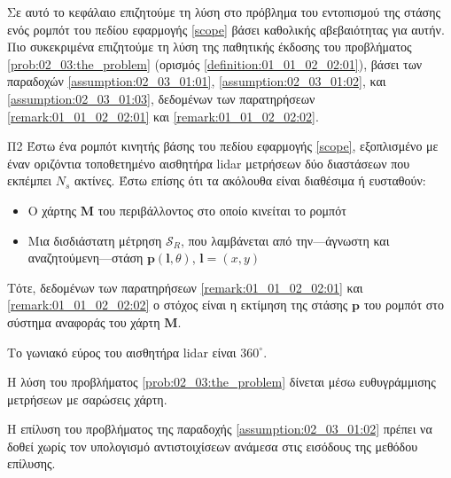 Σε αυτό το κεφάλαιο επιζητούμε τη λύση στο πρόβλημα του εντοπισμού της στάσης
ενός ρομπότ του πεδίου εφαρμογής \ref{scope} βάσει καθολικής αβεβαιότητας για
αυτήν. Πιο συκεκριμένα επιζητούμε τη λύση της παθητικής έκδοσης του προβλήματος
\ref{prob:02_03:the_problem} (ορισμός \ref{definition:01_01_02_02:01}), βάσει
των παραδοχών \ref{assumption:02_03_01:01}, \ref{assumption:02_03_01:02}, και
\ref{assumption:02_03_01:03}, δεδομένων των παρατηρήσεων
\ref{remark:01_01_02_02:01} και \ref{remark:01_01_02_02:02}.

\begin{bw_box}
\begin{customproblem}{Π2}
  \label{prob:02_03:the_problem}
  Έστω ένα ρομπότ κινητής βάσης του πεδίου εφαρμογής \ref{scope}, εξοπλισμένο με
  έναν οριζόντια τοποθετημένο αισθητήρα lidar μετρήσεων δύο διαστάσεων που
  εκπέμπει $N_s$ ακτίνες. Έστω επίσης ότι τα ακόλουθα είναι διαθέσιμα ή
  ευσταθούν:
  \begin{itemize}
    \item Ο χάρτης $\bm{M}$ του περιβάλλοντος στο οποίο κινείται το ρομπότ
    \item Μια δισδιάστατη μέτρηση $\mathcal{S}_R$, που λαμβάνεται από
          την---άγνωστη και αναζητούμενη---στάση $\bm{p}(\bm{l},\theta)$,
          $\bm{l} = (x,y)$
  \end{itemize}
\end{customproblem}
Τότε, δεδομένων των παρατηρήσεων \ref{remark:01_01_02_02:01} και
\ref{remark:01_01_02_02:02} ο στόχος είναι η εκτίμηση της στάσης $\bm{p}$ του
ρομπότ στο σύστημα αναφοράς του χάρτη $\bm{M}$.
\end{bw_box}

\begin{bw_box}
  \begin{assumption}
    \label{assumption:02_03_01:01}
    Το γωνιακό εύρος του αισθητήρα lidar είναι $360^\circ$.
  \end{assumption}
\end{bw_box}

\begin{bw_box}
  \begin{assumption}
    \label{assumption:02_03_01:02}
    Η λύση του προβλήματος \ref{prob:02_03:the_problem} δίνεται μέσω
    ευθυγράμμισης μετρήσεων με σαρώσεις χάρτη.
  \end{assumption}
\end{bw_box}

\begin{bw_box}
  \begin{assumption}
    \label{assumption:02_03_01:03}
    Η επίλυση του προβλήματος της παραδοχής \ref{assumption:02_03_01:02}
    πρέπει να δοθεί χωρίς τον υπολογισμό αντιστοιχίσεων ανάμεσα στις εισόδους
    της μεθόδου επίλυσης.
  \end{assumption}
\end{bw_box}

